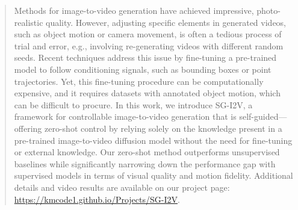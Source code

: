 \begin{abstract}
Methods for image-to-video generation have achieved impressive, photo-realistic quality. 
However, adjusting specific elements in generated videos, such as object motion or camera movement, is often a tedious process of trial and error, e.g., involving re-generating videos with different random seeds. 
Recent techniques address this issue by fine-tuning a pre-trained model to follow conditioning signals, such as bounding boxes or point trajectories. 
Yet, this fine-tuning procedure can be computationally expensive, and it requires datasets with annotated object motion, which can be difficult to procure. 
In this work, we introduce SG-I2V, a framework for controllable image-to-video generation that is self-guided---offering zero-shot control by relying solely on the knowledge present in a pre-trained image-to-video diffusion model without the need for fine-tuning or external knowledge. 
Our zero-shot method outperforms unsupervised baselines while significantly narrowing down the performance gap with supervised models in terms of visual quality and motion fidelity.
Additional details and video results are available on our project page: \url{https://kmcode1.github.io/Projects/SG-I2V}.




\end{abstract}
